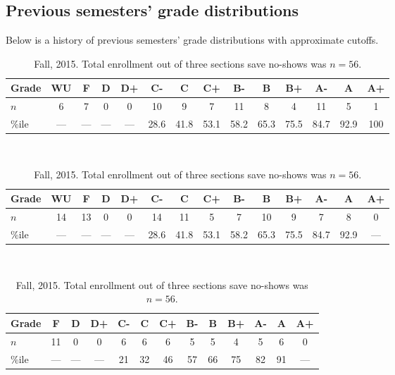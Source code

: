 \subsection*{Previous semesters' grade distributions}

Below is a history of previous semesters' grade distributions with approximate cutoffs.

\begin{table}[h]
\centering
\begin{subtable}[h]{0.85\textwidth}
        \centering
\begin{tabular}{l|ccccccccccccc}
Grade & WU & F   & D      & D+   & C-    & C     & C+    & B-    & B     & B+   & A-    & A      & A+ \\ \hline
$n$   &  6 & 7 & 0      & 0            & 10   & 9      & 7       & 11   & 8     &4       & 11      & 5      & 1 \\
\%ile     &  ---       & --- & ---  &  ---    & 28.6 & 41.8 & 53.1  & 58.2 & 65.3 & 75.5 & 84.7 & 92.9 & 100 \\ \hline
\end{tabular}
\caption{Fall, 2017. Total enrollment out of two sections save no-shows was $n=79$.}
\end{subtable}\\

 \begin{subtable}[h]{0.85\textwidth}
        \centering
\begin{tabular}{l|ccccccccccccc}
Grade & WU & F   & D      & D+   & C-    & C     & C+    & B-    & B     & B+   & A-    & A      & A+ \\ \hline
$n$   &  14          & 13 & 0      & 0     & 14    & 11   & 5       & 7     & 10    & 9     & 7      & 8      & 0 \\
\%ile     &  ---       & --- & ---  &  ---    & 28.6 & 41.8 & 53.1  & 58.2 & 65.3 & 75.5 & 84.7 & 92.9 & --- \\ \hline
\end{tabular}
\caption{Fall, 2016. Total enrollment out of three sections save no-shows was $n=98$.}
\end{subtable}\\

\begin{subtable}[h]{0.85\textwidth}
        \centering
\begin{tabular}{l|cccccccccccc}
Grade & F   & D      & D+   & C-    & C     & C+    & B-    & B     & B+   & A-    & A      & A+ \\ \hline
$n$   & 11    & 0      & 0     & 6      & 6     & 6      & 5     & 5     & 4     & 5      & 6      & 0 \\
\%ile & --- & ---  &  ---        & 21    & 32   & 46    & 57   & 66   & 75 & 82 & 91 & --- \\ \hline
\end{tabular}
\caption{Fall, 2015. Total enrollment out of three sections save no-shows was $n=56$.}
\end{subtable}\\


\end{table}
